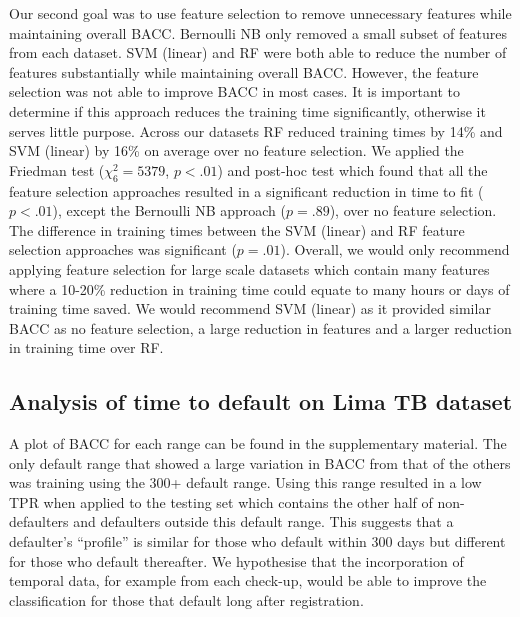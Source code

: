 \documentclass{sig-alternate-05-2015}
\begin{document}
	Our second goal was to use feature selection to remove unnecessary features while maintaining overall BACC. Bernoulli NB only removed a small subset of features from each dataset. SVM (linear) and RF were both able to reduce the number of features substantially while maintaining overall BACC. However, the feature selection was not able to improve BACC in most cases. It is important to determine if this approach reduces the training time significantly, otherwise it serves little purpose. Across our datasets RF reduced training times by 14\% and SVM (linear) by 16\% on average over no feature selection. We applied the Friedman test ($\chi^2_{6}=5379$, $p<.01$) and post-hoc test which found that all the feature selection approaches resulted in a significant reduction in time to fit ($p<.01$), except the Bernoulli NB approach ($p=.89$), over no feature selection. The difference in training times between the SVM (linear) and RF feature selection approaches was significant ($p=.01$). Overall, we would only recommend applying feature selection for large scale datasets which contain many features where a 10-20\% reduction in training time could equate to many hours or days of training time saved. We would recommend SVM (linear) as it provided similar BACC as no feature selection, a large reduction in features and a larger reduction in training time over RF.

	
	\subsection{Analysis of time to default on Lima TB dataset}
	A plot of BACC for each range can be found in the supplementary material. The only default range that showed a large variation in BACC from that of the others was training using the 300+ default range. Using this range resulted in a low TPR when applied to the testing set which contains the other half of non-defaulters and defaulters outside this default range. This suggests that a defaulter's ``profile'' is similar for those who default within 300 days but different for those who default thereafter. We hypothesise that the incorporation of temporal data, for example from each check-up, would be able to improve the classification for those that default long after registration. 	
	
\end{document}
